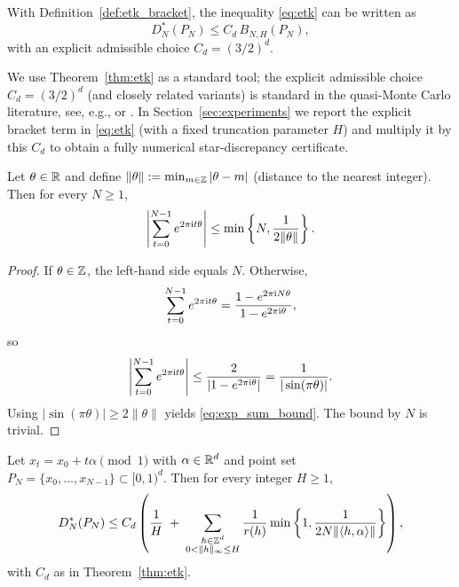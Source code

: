 \begin{remark}
With Definition~\ref{def:etk_bracket}, the inequality \eqref{eq:etk} can be written as
\begin{equation}
\label{eq:etk_compact}
D_N^\ast(P_N)\le C_d\,B_{N,H}(P_N),
\end{equation}
with an explicit admissible choice $C_d=(3/2)^d$.
\end{remark}

\begin{remark}
We use Theorem~\ref{thm:etk} as a standard tool; the explicit admissible choice $C_d=(3/2)^d$ (and closely related variants) is standard in the quasi-Monte Carlo literature, see, e.g., \cite[Ch.\ 2]{Niederreiter1992} or \cite[Ch.\ 3]{DickPillichshammer2010}.
In Section~\ref{sec:experiments} we report the explicit bracket term in \eqref{eq:etk} (with a fixed truncation parameter $H$) and multiply it by this $C_d$ to obtain a fully numerical star-discrepancy certificate.
\end{remark}

\begin{lemma}
\label{lem:kronecker_exp_sum}
Let $\theta\in\mathbb{R}$ and define $\|\theta\|:=\min_{m\in\mathbb{Z}}|\theta-m|$ (distance to the nearest integer). Then for every $N\ge 1$,
\begin{equation}
\label{eq:exp_sum_bound}
\left|\sum_{t=0}^{N-1} e^{2\pi \mathrm{i} t\theta}\right|
\le
\min\left\{N,\frac{1}{2\|\theta\|}\right\}.
\end{equation}
\end{lemma}

\begin{proof}
If $\theta\in\mathbb{Z}$, the left-hand side equals $N$. Otherwise,
\[
\sum_{t=0}^{N-1} e^{2\pi \mathrm{i} t\theta}
=\frac{1-e^{2\pi \mathrm{i} N\theta}}{1-e^{2\pi \mathrm{i} \theta}},
\]
so
\[
\left|\sum_{t=0}^{N-1} e^{2\pi \mathrm{i} t\theta}\right|
\le \frac{2}{|1-e^{2\pi \mathrm{i} \theta}|}
=\frac{1}{|\sin(\pi \theta)|}.
\]
Using $|\sin(\pi\theta)|\ge 2\|\theta\|$ yields \eqref{eq:exp_sum_bound}. The bound by $N$ is trivial.
\end{proof}

\begin{proposition}
\label{prop:kronecker_discrepancy_bound}
Let $x_t=x_0+t\alpha\pmod{1}$ with $\alpha\in\mathbb{R}^d$ and point set $P_N=\{x_0,\dots,x_{N-1}\}\subset[0,1)^d$. Then for every integer $H\ge 1$,
\begin{equation}
\label{eq:kronecker_discrepancy_bound}
D_N^\ast(P_N)
\le
C_d\left(
\frac{1}{H}
\;+\;
\sum_{\substack{h\in\mathbb{Z}^d\\0<\|h\|_\infty\le H}}
\frac{1}{r(h)}
\min\left\{1,\frac{1}{2N\|\langle h,\alpha\rangle\|}\right\}
\right),
\end{equation}
with $C_d$ as in Theorem~\ref{thm:etk}.
\end{proposition}

